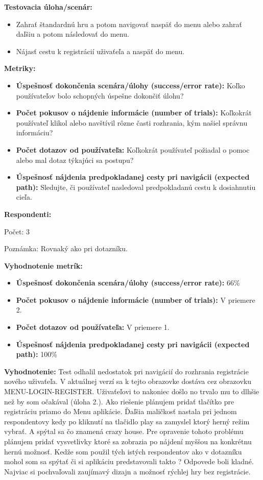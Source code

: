 \documentclass[a4paper, 11pt, onecolumn]{article}
\begin{document}
\textbf{Testovacia úloha/scenár:} 
\begin{itemize}
  \item Zahrať štandardnú hru a potom navigovať naspäť do menu alebo zahrať daľšiu a potom následovať do menu.
  \item Nájasť cestu k registrácií uživaťeľa a naspäť do menu.
\end{itemize}

\textbf{Metriky:}
\begin{itemize}
    \item \textbf{Úspešnosť dokončenia scenára/úlohy (success/error rate):} Koľko používateľov bolo schopných úspešne dokončiť úlohu?
    \item \textbf{Počet pokusov o nájdenie informácie (number of trials):} Koľkokrát používateľ klikol alebo navštívil rôzne časti rozhrania, kým našiel správnu informáciu?
    \item \textbf{Počet dotazov od používateľa:} Koľkokrát používateľ požiadal o pomoc alebo mal dotaz týkajúci sa postupu?
    \item \textbf{Úspešnosť nájdenia predpokladanej cesty pri navigácii (expected path):} Sledujte, či používateľ nasledoval predpokladanú cestu k dosiahnutiu cieľa.
\end{itemize}

\textbf{Respondenti:}

Počet: 3 

Poznámka: Rovnaký ako pri dotazníku.

\textbf{Vyhodnotenie metrík:}
\begin{itemize}
    \item \textbf{Úspešnosť dokončenia scenára/úlohy (success/error rate):} 66\%
    \item \textbf{Počet pokusov o nájdenie informácie (number of trials):} V priemere 2.
    \item \textbf{Počet dotazov od používateľa:} V priemere 1.
    \item \textbf{Úspešnosť nájdenia predpokladanej cesty pri navigácii (expected path):} 100\%
\end{itemize}

\textbf{Vyhodnotenie:}
Test odhalil nedostatok pri navigácií do rozhrania registrácie nového uživaťeľa. V aktuálnej verzí sa k tejto obrazovke dostáva cez obrazovku MENU-LOGIN-REGISTER.
Uživaťeľovi to nakoniec došlo no trvalo mu to dlhšie než by som očakával (úloha 2.). Ako riešenie plánujem pridať tlačítko pre registráciu priamo do Menu aplikácie.
Ďaľšia maličkosť nastala pri jednom respondentovy kedy po kliknutí na tlačidlo play sa zamyslel ktorý herný režim vybrať.
A spýtal sa čo znamená crazy house. Pre opravenie tohoto problému plánujem pridať vysvetlivky ktoré sa  zobrazia po nájdení myššou na konkrétnu hernú možnosť.
Kedže som použil tých istých respondentov ako v dotazníku mohol som sa spýtať či si aplikáciu predstavovali takto ?
Odpovede boli kladné. Najviac si pochvaľovali zaujímavý dizajn a možnosť rýchlej hry bez registrácie.

 
\end{document}
